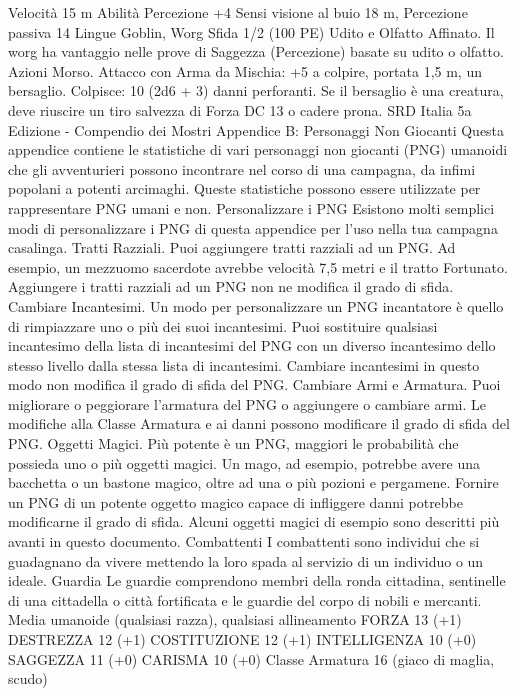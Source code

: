 \begin{multicols}{2}
Velocità 15 m
Abilità Percezione +4
Sensi visione al buio 18 m, Percezione passiva 14
Lingue Goblin, Worg
Sfida 1/2 (100 PE)
Udito e Olfatto Affinato. Il worg ha vantaggio nelle prove di
Saggezza (Percezione) basate su udito o olfatto.
Azioni
Morso. Attacco con Arma da Mischia: +5 a colpire, portata 1,5
m, un bersaglio.
Colpisce: 10 (2d6 + 3) danni perforanti. Se il bersaglio è una
creatura, deve riuscire un tiro salvezza di Forza DC 13 o cadere
prona.
SRD Italia 5a Edizione - Compendio dei Mostri
Appendice B:
Personaggi Non
Giocanti
Questa appendice contiene le statistiche di vari
personaggi non giocanti (PNG) umanoidi che gli
avventurieri possono incontrare nel corso di una
campagna, da infimi popolani a potenti arcimaghi.
Queste statistiche possono essere utilizzate per
rappresentare PNG umani e non.
Personalizzare i PNG
Esistono molti semplici modi di personalizzare i PNG di
questa appendice per l’uso nella tua campagna
casalinga.
Tratti Razziali. Puoi aggiungere tratti razziali ad un
PNG. Ad esempio, un mezzuomo sacerdote avrebbe
velocità 7,5 metri e il tratto Fortunato. Aggiungere i tratti
razziali ad un PNG non ne modifica il grado di sfida.
Cambiare Incantesimi. Un modo per personalizzare
un PNG incantatore è quello di rimpiazzare uno o più
dei suoi incantesimi. Puoi sostituire qualsiasi
incantesimo della lista di incantesimi del PNG con un
diverso incantesimo dello stesso livello dalla stessa
lista di incantesimi. Cambiare incantesimi in questo
modo non modifica il grado di sfida del PNG.
Cambiare Armi e Armatura. Puoi migliorare o
peggiorare l’armatura del PNG o aggiungere o
cambiare armi. Le modifiche alla Classe Armatura e ai
danni possono modificare il grado di sfida del PNG.
Oggetti Magici. Più potente è un PNG, maggiori le
probabilità che possieda uno o più oggetti magici. Un
mago, ad esempio, potrebbe avere una bacchetta o un
bastone magico, oltre ad una o più pozioni e
pergamene. Fornire un PNG di un potente oggetto
magico capace di infliggere danni potrebbe modificarne
il grado di sfida.
Alcuni oggetti magici di esempio sono descritti più
avanti in questo documento.
Combattenti
I combattenti sono individui che si guadagnano da
vivere mettendo la loro spada al servizio di un individuo
o un ideale.
Guardia
Le guardie comprendono membri della ronda cittadina,
sentinelle di una cittadella o città fortificata e le guardie
del corpo di nobili e mercanti.
Media umanoide (qualsiasi razza), qualsiasi allineamento
FORZA 13 (+1)
DESTREZZA 12 (+1)
COSTITUZIONE 12 (+1)
INTELLIGENZA 10 (+0)
SAGGEZZA 11 (+0)
CARISMA 10 (+0)
Classe Armatura 16 (giaco di maglia, scudo)

\end{multicols}
